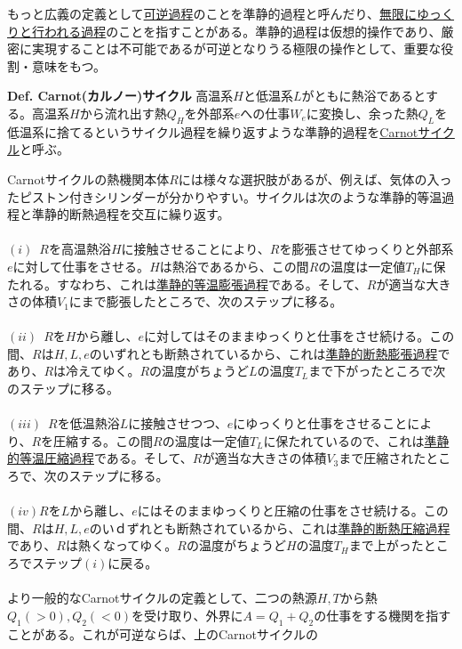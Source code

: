 \documentclass{jsarticle}
\begin{document}
もっと広義の定義として\underline{可逆過程}のことを準静的過程と呼んだり、\underline{無限にゆっくりと行われる過程}のことを指すことがある。準静的過程は仮想的操作であり、厳密に実現することは不可能であるが可逆となりうる極限の操作として、重要な役割・意味をもつ。\\
\hypertarget{Carnotサイクル}{}
\begin{itembox}[l]{\textbf{Def. Carnot(カルノー)サイクル}}
高温系\(H\)と低温系\(L\)がともに熱浴であるとする。高温系\(H\)から流れ出す熱\(Q_{H}\)を外部系\(e\)への仕事\(W_{e}\)に変換し、余った熱\(Q_{L}\)を低温系に捨てるというサイクル過程を繰り返すような準静的過程を\underline{Carnotサイクル}と呼ぶ。
\end{itembox}
Carnotサイクルの熱機関本体\(R\)には様々な選択肢があるが、例えば、気体の入ったピストン付きシリンダーが分かりやすい。サイクルは次のような準静的等温過程と準静的断熱過程を交互に繰り返す。\\
\\
\((i)\)~\(R\)を高温熱浴\(H\)に接触させることにより、\(R\)を膨張させてゆっくりと外部系\(e\)に対して仕事をさせる。\(H\)は熱浴であるから、この間\(R\)の温度は一定値\(T_{H}\)に保たれる。すなわち、これは\underline{準静的等温膨張過程}である。そして、\(R\)が適当な大きさの体積\(V_{1}\)にまで膨張したところで、次のステップに移る。\\
\\
\((ii)\)~\(R\)を\(H\)から離し、\(e\)に対してはそのままゆっくりと仕事をさせ続ける。この間、\(R\)は\(H,L,e\)のいずれとも断熱されているから、これは\underline{準静的断熱膨張過程}であり、\(R\)は冷えてゆく。\(R\)の温度がちょうど\(L\)の温度\(T_{L}\)まで下がったところで次のステップに移る。\\
\\
\((iii)\)~\(R\)を低温熱浴\(L\)に接触させつつ、\(e\)にゆっくりと仕事をさせることにより、\(R\)を圧縮する。この間\(R\)の温度は一定値\(T_{L}\)に保たれているので、これは\underline{準静的等温圧縮過程}である。そして、\(R\)が適当な大きさの体積\(V_{3}\)まで圧縮されたところで、次のステップに移る。\\
\\
\((iv)\)\(R\)を\(L\)から離し、\(e\)にはそのままゆっくりと圧縮の仕事をさせ続ける。この間、\(R\)は\(H,L,e\)のいｄずれとも断熱されているから、これは\underline{準静的断熱圧縮過程}であり、\(R\)は熱くなってゆく。\(R\)の温度がちょうど\(H\)の温度\(T_{H}\)まで上がったところでステップ\((i)\)に戻る。\\
\\
より一般的なCarnotサイクルの定義として、二つの熱源\(H,T\)から熱\(Q_{1}(>0),Q_{2}(<0)\)を受け取り、外界に\(A=Q_{1}+Q_{2}\)の仕事をする機関を指すことがある。これが可逆ならば、上のCarnotサイクルの
\end{document}
